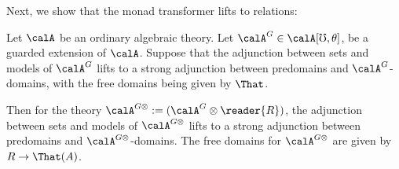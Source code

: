 Next, we show that the monad transformer lifts to relations:
\begin{lemma}\label{lem:reader-monad-transformer-free-domains}
    Let $\calA$ be an ordinary algebraic theory. Let $\calA^G \in \calA[\mho,
    \theta]$, be a guarded extension of $\calA$. Suppose that the adjunction
    between sets and models of $\calA^G$ lifts to a strong adjunction between
    predomains and $\calA^G$-domains, with the free domains being given by
    $\That$.
    
    Then for the theory $\calA^{G\otimes} := (\calA^{G} \otimes \reader{R})$,
    the adjunction between sets and models of $\calA^{G\otimes}$ lifts to a
    strong adjunction between predomains and $\calA^{G\otimes}$-domains. The
    free domains for $\calA^{G\otimes}$ are given by $R \to \That(A)$.
\end{lemma}
